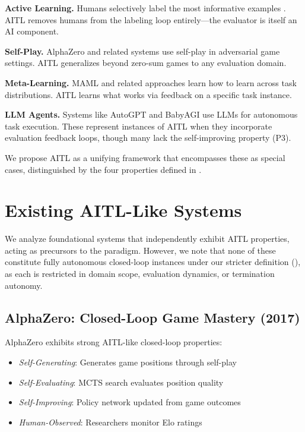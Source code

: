 \documentclass[11pt]{article}
\begin{document}
\textbf{Active Learning.} Humans selectively label the most informative examples \citep{settles2009active}. AITL removes humans from the labeling loop entirely---the evaluator is itself an AI component.

\textbf{Self-Play.} AlphaZero \citep{silver2017mastering} and related systems use self-play in adversarial game settings. AITL generalizes beyond zero-sum games to any evaluation domain.

\textbf{Meta-Learning.} MAML \citep{finn2017model} and related approaches learn how to learn across task distributions. AITL learns what works via feedback on a specific task instance.

\textbf{LLM Agents.} Systems like AutoGPT \citep{richards2023autogpt} and BabyAGI \citep{nakajima2023babyagi} use LLMs for autonomous task execution. These represent instances of AITL when they incorporate evaluation feedback loops, though many lack the self-improving property (P3).

We propose AITL as a unifying framework that encompasses these as special cases, distinguished by the four properties defined in .

\section{Existing AITL-Like Systems}
\label{sec:existing}

We analyze foundational systems that independently exhibit AITL properties, acting as precursors to the paradigm. However, we note that none of these constitute fully autonomous closed-loop instances under our stricter definition (), as each is restricted in domain scope, evaluation dynamics, or termination autonomy.

\subsection{AlphaZero: Closed-Loop Game Mastery (2017)}

AlphaZero \citep{silver2017mastering} exhibits strong AITL-like closed-loop properties:
\begin{itemize}[nosep]
  \item \emph{Self-Generating}: Generates game positions through self-play
  \item \emph{Self-Evaluating}: MCTS search evaluates position quality
  \item \emph{Self-Improving}: Policy network updated from game outcomes
  \item \emph{Human-Observed}: Researchers monitor Elo ratings
\end{itemize}
\end{document}
